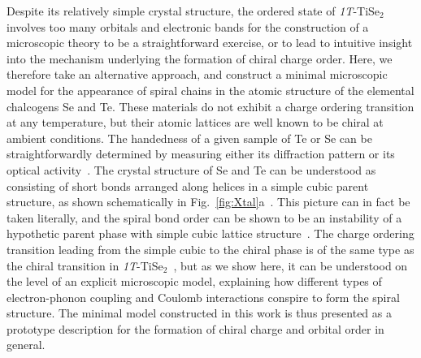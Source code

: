 \documentclass[aps,prl,twocolumn,superscriptaddress,groupedaddress]{revtex4}
\begin{document}
Despite its relatively simple crystal structure, the ordered state of \emph{1T}-TiSe$_2$ involves too many orbitals and electronic bands for the construction of a microscopic theory to be a straightforward exercise, or to lead to intuitive insight into the mechanism underlying the formation of chiral charge order. Here, we therefore take an alternative approach, and construct a minimal microscopic model for the appearance of spiral chains in the atomic structure of the elemental chalcogens Se and Te. These materials do not exhibit a charge ordering transition at any temperature, but their atomic lattices are well known to be chiral at ambient conditions. The handedness of a given sample of Te or Se can be straightforwardly determined by measuring either its diffraction pattern or its optical activity~\cite{tanaka}. The crystal structure of Se and Te can be understood as consisting of short bonds arranged along helices in a simple cubic parent structure, as shown schematically in Fig.~\ref{fig:Xtal}a~\cite{tanaka}. This picture can in fact be taken literally, and the spiral bond order can be shown to be an instability of a hypothetic parent phase with simple cubic lattice structure~\cite{fukutome,fukutome2,vanwezellittlewood}. The charge ordering transition leading from the simple cubic to the chiral phase is of the same type as the chiral transition in \emph{1T}-TiSe$_2$~\cite{vanwezel}, but as we show here, it can be understood on the level of an explicit microscopic model, explaining how different types of electron-phonon coupling and Coulomb interactions conspire to form the spiral structure. The minimal model constructed in this work is thus presented as a prototype description for the formation of chiral charge and orbital order in general.
\end{document}
